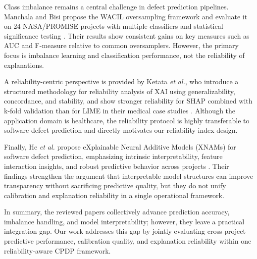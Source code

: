\documentclass[conference]{IEEEtran}
\begin{document}
Class imbalance remains a central challenge in defect prediction pipelines. Manchala and Bisi propose the WACIL oversampling framework and evaluate it on 24 NASA/PROMISE projects with multiple classifiers and statistical significance testing \cite{r4}. Their results show consistent gains on key measures such as AUC and F-measure relative to common oversamplers. However, the primary focus is imbalance learning and classification performance, not the reliability of explanations.

A reliability-centric perspective is provided by Ketata \emph{et al.}, who introduce a structured methodology for reliability analysis of XAI using generalizability, concordance, and stability, and show stronger reliability for SHAP combined with k-fold validation than for LIME in their medical case studies \cite{r5}. Although the application domain is healthcare, the reliability protocol is highly transferable to software defect prediction and directly motivates our reliability-index design.

Finally, He \emph{et al.} propose eXplainable Neural Additive Models (XNAMs) for software defect prediction, emphasizing intrinsic interpretability, feature interaction insights, and robust predictive behavior across projects \cite{r6}. Their findings strengthen the argument that interpretable model structures can improve transparency without sacrificing predictive quality, but they do not unify calibration and explanation reliability in a single operational framework.

In summary, the reviewed papers collectively advance prediction accuracy, imbalance handling, and model interpretability; however, they leave a practical integration gap. Our work addresses this gap by jointly evaluating cross-project predictive performance, calibration quality, and explanation reliability within one reliability-aware CPDP framework.
\end{document}
